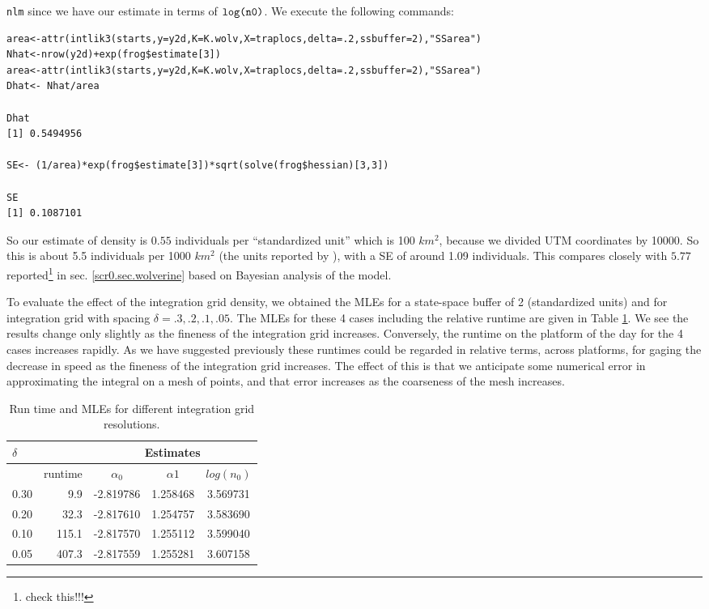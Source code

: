 \mbox{\tt nlm} since we have our  estimate in terms of $\mbox{\tt
  log(n0)}$. We execute the following commands:
{\small 
\begin{verbatim}
area<-attr(intlik3(starts,y=y2d,K=K.wolv,X=traplocs,delta=.2,ssbuffer=2),"SSarea")
Nhat<-nrow(y2d)+exp(frog$estimate[3])
area<-attr(intlik3(starts,y=y2d,K=K.wolv,X=traplocs,delta=.2,ssbuffer=2),"SSarea")
Dhat<- Nhat/area

Dhat
[1] 0.5494956

SE<- (1/area)*exp(frog$estimate[3])*sqrt(solve(frog$hessian)[3,3])

SE
[1] 0.1087101
\end{verbatim}
} 
So our estimate of density is $0.55$ individuals per ``standardized
unit'' which is 100 $km^2$, because we divided UTM coordinates by
10000.  So this is about 5.5 individuals per 1000 $km^2$ (the units
reported by \citep{royle_etal:2011jwm}), with a SE of around 1.09
individuals.  This compares closely with $5.77$
reported\footnote{check this!!!} in
sec. \ref{scr0.sec.wolverine} based on Bayesian
analysis of the model.


To evaluate the effect of the integration grid density, 
we obtained the MLEs for a state-space buffer of 2 (standardized
units) and for integration grid with spacing $\delta = .3, .2, .1,
.05$. The MLEs for these 4 cases including the relative runtime are
given in Table \ref{mle.tab.integration}.
We see the results change only slightly as the fineness of the
integration grid increases. Conversely, the runtime on the platform of
the day for the 4 cases increases rapidly. 
As we have suggested previously these runtimes could be regarded in
relative terms,  across platforms, for gaging the decrease in
speed as the fineness of the integration grid increases. The effect of
this is that we anticipate some numerical error in approximating the
integral on a mesh of points, and that error increases as the
coarseness of the mesh increases. 


\begin{table}[ht]
\centering
\caption{Run time and MLEs for different integration grid resolutions.}
\begin{tabular}{l|rccc}
\hline \hline
$\delta$ &   & \multicolumn{3}{c}{Estimates} \\ \hline
         &  runtime        & $\alpha_0$ & $\alpha1$ & $log(n_0)$ \\ \hline
 0.30   &  9.9  &  -2.819786 & 1.258468 & 3.569731  \\
 0.20   & 32.3  &  -2.817610 & 1.254757 & 3.583690 \\
 0.10  & 115.1  &  -2.817570 & 1.255112 & 3.599040 \\
 0.05 &  407.3 &   -2.817559&  1.255281&  3.607158 \\
\end{tabular}
\label{mle.tab.integration}
\end{table}


